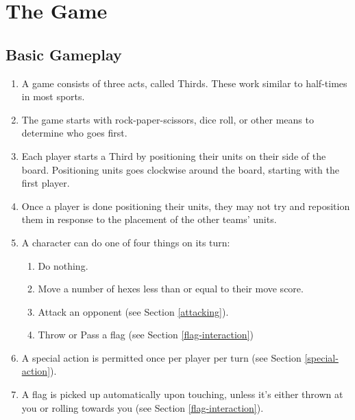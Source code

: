\chapter{The Game}
\section{Basic Gameplay} \label{basic-gameplay}
\begin{enumerate}
    \item A game consists of three acts, called Thirds. These work similar to half-times in most sports.
    \item The game starts with rock-paper-scissors, dice roll, or other means to determine who goes first.
    \item Each player starts a Third by positioning their units on their side of the board. Positioning units goes clockwise around the board, starting with the first player. 
    \item Once a player is done positioning their units, they may not try and reposition them in response to the placement of the other teams’ units.
    \item A character can do one of four things on its turn:
    \begin{enumerate}
        \item Do nothing.
        \item Move a number of hexes less than or equal to their move score.
        \item Attack an opponent (see Section \ref{attacking}).
        \item Throw or Pass a flag (see Section \ref{flag-interaction})
    \end{enumerate}
    \item A special action is permitted once per player per turn (see Section \ref{special-action}).
    \item A flag is picked up automatically upon touching, unless it’s either thrown at you or rolling towards you (see Section \ref{flag-interaction}).
\end{enumerate}






%
%

